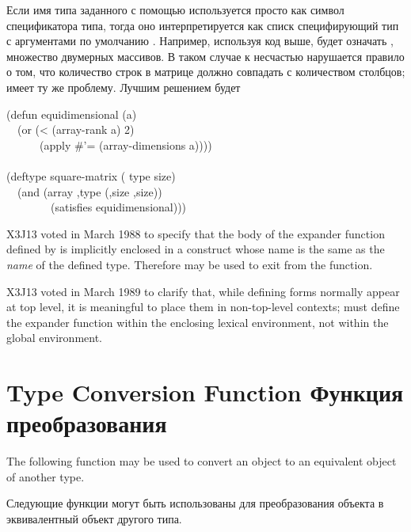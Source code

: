 \begin{defmac}
Если имя типа заданного с помощью  используется просто как символ
спецификатора типа, тогда оно интерпретируется как списк специфирующий тип с
аргументами по умолчанию \cd{*}. Например, используя код выше,
 будет означать , множество двумерных
массивов.
В таком случае к несчастью нарушается правило о том, что количество строк в
матрице должно совпадать с количеством столбцов;  имеет
ту же проблему.
Лучшим решением будет
\begin{lisp}
(defun equidimensional (a) \\
~~(or (< (array-rank a) 2) \\
~~~~~~(apply \#'= (array-dimensions a)))) \\
 \\
(deftype square-matrix ( type size) \\
~~{\Xbq}(and (array ,type (,size ,size)) \\
~~~~~~~~(satisfies equidimensional)))
\end{lisp}

\begin{newer}
X3J13 voted in March 1988 
to specify that the body of the expander function defined
by  is implicitly enclosed in a  construct
whose name is the same as the \textit{name} of the defined type.
Therefore  may be used to exit from the function.
\end{newer}

\begin{newer}
X3J13 voted in March 1989 
to clarify that, while defining forms normally appear at top level,
it is meaningful to place them in non-top-level contexts;
 must define the expander function
within the enclosing lexical environment, not within the global
environment.
\end{newer}

\end{defmac}

\section{Type Conversion Function Функция преобразования}

The following function may be used to convert an object to an
equivalent object of another type.

Следующие функции могут быть использованы для преобразования объекта в
эквивалентный объект другого типа.

